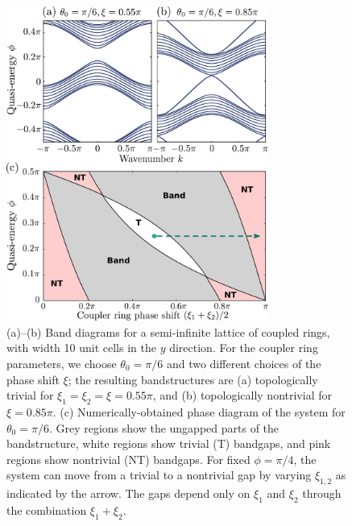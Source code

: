 \documentclass[aps,prx,twocolumn,superscriptaddress]{revtex4-1}
\newcommand{\figwidth}{8.6cm}
\begin{document}
\begin{figure}
  \centering
  \includegraphics[width=\figwidth]{fig_wy/band_psi.pdf}
  \caption{(a)--(b) Band diagrams for a semi-infinite lattice of coupled rings, with width 10 unit cells in the $y$ direction.  For the coupler ring parameters, we choose $\theta_0 = \pi/6$ and two different choices of the phase shift $\xi$; the resulting bandstructures are (a) topologically trivial for $\xi_1 = \xi_2 = \xi = 0.55\pi$, and (b) topologically nontrivial for $\xi = 0.85\pi$.  (c) Numerically-obtained phase diagram of the system for $\theta_0 = \pi/6$.  Grey regions show the ungapped parts of the bandstructure, white regions show trivial (T) bandgaps, and pink regions show nontrivial (NT) bandgaps.  For fixed $\phi = \pi/4$, the system can move from a trivial to a nontrivial gap by varying $\xi_{1,2}$ as indicated by the arrow.  The gaps depend only on $\xi_1$ and $\xi_2$ through the combination $\xi_1 + \xi_2$.}
  \label{fig:Bands}
\end{figure}
\end{document}
